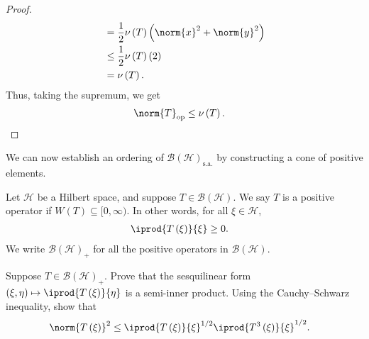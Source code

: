 \documentclass[10pt]{mypackage}
\newcommand{\sa}{\text{s.a.}}
\begin{document}
\begin{proof}
\begin{align*}
                                                      &= \frac{1}{2}\nu\left(T\right)\left(\norm{x}^2 + \norm{y}^2\right)\\
                                                      &\leq \frac{1}{2}\nu\left(T\right)\left(2\right)\\
                                                      &= \nu\left(T\right).
  \end{align*}
  Thus, taking the supremum, we get
  \begin{align*}
    \norm{T}_{\text{op}} &\leq \nu\left(T\right).
  \end{align*}
\end{proof}
We can now establish an ordering of $\mathcal{B}\left(\mathcal{H}\right)_{\sa}$ by constructing a cone of positive elements.
\begin{definition}[]
  Let $\mathcal{H}$ be a Hilbert space, and suppose $T\in \mathcal{B}\left(\mathcal{H}\right)$. We say $T$ is a positive operator if $W(T) \subseteq [0,\infty)$. In other words, for all $\xi\in \mathcal{H}$,
  \begin{align*}
    \iprod{T\left(\xi\right)}{\xi} &\geq 0.
  \end{align*}
  We write $\mathcal{B}\left(\mathcal{H}\right)_{+}$ for all the positive operators in $\mathcal{B}\left(\mathcal{H}\right)$.
\end{definition}
\begin{exercise}
  Suppose $T\in \mathcal{B}\left(\mathcal{H}\right)_{+}$. Prove that the sesquilinear form $\left(\xi,\eta\right)\mapsto \iprod{T\left(\xi\right)}{\eta}$ is a semi-inner product. Using the Cauchy--Schwarz inequality, show that
  \begin{align*}
    \norm{T\left(\xi\right)}^2 &\leq \iprod{T\left(\xi\right)}{\xi}^{1/2} \iprod{T^3\left(\xi\right)}{\xi}^{1/2}.
  \end{align*}
\end{exercise}
\end{document}
